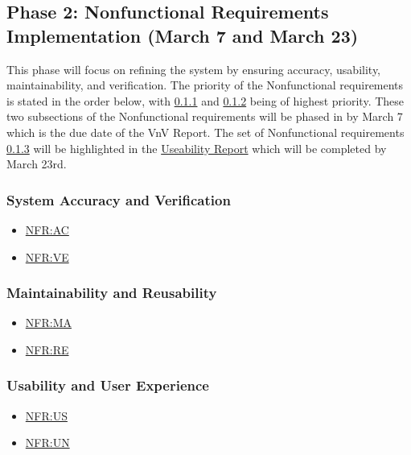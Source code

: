 \documentclass[12pt]{article}
\newcommand{\hpref}[1]{\hyperref[#1]{#1}}
\begin{document}
  \subsection{Phase 2: Nonfunctional Requirements Implementation (March 7 and March 23) }
  
  This phase will focus on refining the system by ensuring accuracy, usability, maintainability, and verification.
  The priority of the Nonfunctional requirements is stated in the order below, with \ref{subsec:System Accuracy and Verification} and \ref{subsec:Maintainability and Reusability} being of highest priority.
  These two subsections of the Nonfunctional requirements will be phased in by March 7 which is the due date of the VnV Report. 
  The set of Nonfunctional requirements \ref{subsec:Usability and User Experience} will be highlighted in the \href{https://github.com/gr812b/CVT-Simulator/blob/main/docs/UsabilityReport/UsabilityReport.pdf}{Useability Report} which will be completed by March 23rd.
  
  \subsubsection{System Accuracy and Verification}
  \label{subsec:System Accuracy and Verification}
  \begin{itemize}
      \item \hpref{NFR:AC}
      \item \hpref{NFR:VE}
  \end{itemize}
  
  \subsubsection{Maintainability and Reusability}
  \label{subsec:Maintainability and Reusability}
  \begin{itemize}
      \item \hpref{NFR:MA}
      \item \hpref{NFR:RE} 
  \end{itemize}

  \subsubsection{Usability and User Experience}
  \label{subsec:Usability and User Experience}
  \begin{itemize}
      \item \hpref{NFR:US}
      \item \hpref{NFR:UN}
  \end{itemize}
  
\end{document}
